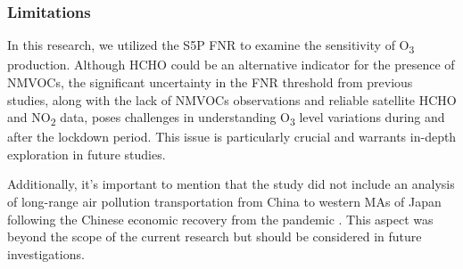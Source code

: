 \subsubsection{Limitations}
In this research, we utilized the S5P FNR to examine the sensitivity of O\textsubscript{3} production. Although HCHO could be an alternative indicator for the presence of NMVOCs, the significant uncertainty in the FNR threshold from previous studies, along with the lack of NMVOCs observations and reliable satellite HCHO and NO\textsubscript{2} data, poses challenges in understanding O\textsubscript{3} level variations during and after the lockdown period. This issue is particularly crucial and warrants in-depth exploration in future studies. \par
Additionally, it's important to mention that the study did not include an analysis of long-range air pollution transportation from China to western MAs of Japan following the Chinese economic recovery from the pandemic \citep{itahashi2022returning}. This aspect was beyond the scope of the current research but should be considered in future investigations. \par

